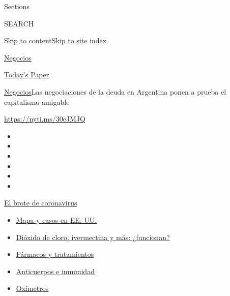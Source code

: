 Sections

SEARCH

\protect\hyperlink{site-content}{Skip to
content}\protect\hyperlink{site-index}{Skip to site index}

\href{https://www.nytimes3xbfgragh.onion/es/section/negocios}{Negocios}

\href{https://myaccount.nytimes3xbfgragh.onion/auth/login?response_type=cookie\&client_id=vi}{}

\href{https://www.nytimes3xbfgragh.onion/section/todayspaper}{Today's
Paper}

\href{/es/section/negocios}{Negocios}\textbar{}Las negociaciones de la
deuda en Argentina ponen a prueba el capitalismo amigable

\url{https://nyti.ms/30eJMJQ}

\begin{itemize}
\item
\item
\item
\item
\item
\item
\end{itemize}

\href{https://www.nytimes3xbfgragh.onion/es/spotlight/coronavirus?action=click\&pgtype=Article\&state=default\&region=TOP_BANNER\&context=storylines_menu}{El
brote de coronavirus}

\begin{itemize}
\tightlist
\item
  \href{https://www.nytimes3xbfgragh.onion/es/interactive/2020/espanol/mundo/coronavirus-en-estados-unidos.html?action=click\&pgtype=Article\&state=default\&region=TOP_BANNER\&context=storylines_menu}{Mapa
  y casos en EE. UU.}
\item
  \href{https://www.nytimes3xbfgragh.onion/es/2020/07/23/espanol/america-latina/bolivia-cloro-coronavirus-ivermectina.html?action=click\&pgtype=Article\&state=default\&region=TOP_BANNER\&context=storylines_menu}{Dióxido
  de cloro, ivermectina y más: ¿funcionan?}
\item
  \href{https://www.nytimes3xbfgragh.onion/es/interactive/2020/science/coronavirus-tratamientos-curas.html?action=click\&pgtype=Article\&state=default\&region=TOP_BANNER\&context=storylines_menu}{Fármacos
  y tratamientos}
\item
  \href{https://www.nytimes3xbfgragh.onion/es/2020/07/28/espanol/ciencia-y-tecnologia/anticuerpos-coronavirus-inmunidad.html?action=click\&pgtype=Article\&state=default\&region=TOP_BANNER\&context=storylines_menu}{Anticuerpos
  e inmunidad}
\item
  \href{https://www.nytimes3xbfgragh.onion/es/2020/04/29/espanol/estilos-de-vida/oximetro-para-que-sirve.html?action=click\&pgtype=Article\&state=default\&region=TOP_BANNER\&context=storylines_menu}{Oxímetros}
\end{itemize}

